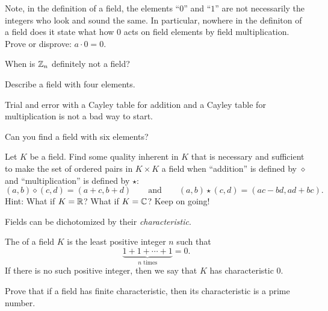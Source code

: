 \documentclass{ximera}
\begin{document}
\begin{exercise}
  Note, in the definition of a field, the elements ``$0$'' and ``$1$''
  are not necessarily the integers who look and sound the same. In
  particular, nowhere in the definiton of a field does it state what
  how $0$ acts on field elements by field multiplication. Prove or
  disprove: $a\cdot 0 = 0$.
\end{exercise}



\begin{exercise} 
  When is $\mathbb Z_n$ definitely not a field?
\end{exercise}

\begin{exercise}\label{E:FF4}
  Describe a field with four elements.
  \begin{hint}
    Trial and error with a Cayley table for addition and a Cayley
    table for multiplication is not a bad way to start.
  \end{hint}
\end{exercise}


\begin{exercise}\label{E:FF6} Can you find a field with six elements?
\end{exercise}


\begin{exercise} 
Let $K$ be a field. Find some quality inherent in $K$ that is
necessary and sufficient to make the set of ordered pairs in $K\times
K$ a field when ``addition'' is defined by $\diamond$ and
``multiplication'' is defined by $\star$:
\[
(a,b)\diamond (c,d) = (a+c, b+d)\qquad\text{and}\qquad (a,b)\star (c,d) =
(ac-bd,ad+bc).
\]
Hint: What if $K = \mathbb R$? What if $K = \mathbb C$? Keep on going!
\end{exercise}






Fields can be dichotomized by their \textit{characteristic}.

\begin{definition}
The  of a field $K$ is the least positive
integer $n$ such that
\[
\underbrace{1 + 1 + \cdots +1}_{\text{$n$ times}} =0.
\]
If there is no such positive integer, then we say that $K$ has
characteristic $0$.
\end{definition}

\begin{exercise} 
Prove that if a field has finite characteristic, then its
characteristic is a prime number.
\end{exercise}
\end{document}
